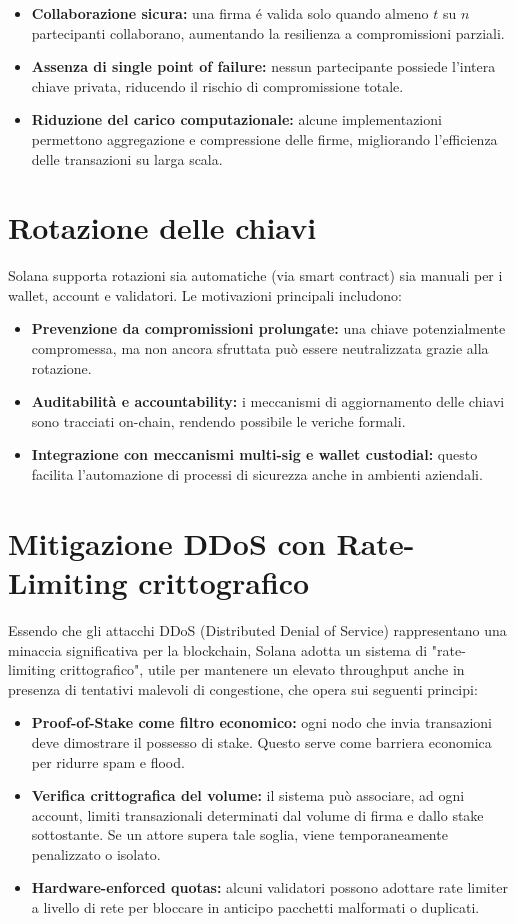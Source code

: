 \documentclass[a4paper,12pt]{report}
\begin{document}
	\begin{itemize}
		\item \textbf{Collaborazione sicura:} una firma é valida solo quando almeno \( t \) su \( n \) partecipanti collaborano, aumentando la resilienza a compromissioni parziali.
		\item \textbf{Assenza di single point of failure:} nessun partecipante possiede l’intera chiave privata, riducendo il rischio di compromissione totale.
		\item \textbf{Riduzione del carico computazionale:} alcune implementazioni permettono aggregazione e compressione delle firme, migliorando l’efficienza delle transazioni su larga scala.
	\end{itemize}
	
	\section{Rotazione delle chiavi}
	Solana supporta rotazioni sia automatiche (via smart contract) sia manuali per i wallet, account e validatori. Le motivazioni principali includono:
	\begin{itemize}
		\item \textbf{Prevenzione da compromissioni prolungate:} una chiave potenzialmente compromessa, ma non ancora sfruttata può essere neutralizzata grazie alla rotazione.
		\item \textbf{Auditabilità e accountability:} i meccanismi di aggiornamento delle chiavi sono tracciati on-chain, rendendo possibile le veriche formali.
		\item \textbf{Integrazione con meccanismi multi-sig e wallet custodial:} questo facilita l'automazione di processi di sicurezza anche in ambienti aziendali.
	\end{itemize}
	
	\section{Mitigazione DDoS con Rate-Limiting crittografico}
	Essendo che gli attacchi DDoS (Distributed Denial of Service) rappresentano una minaccia significativa per la blockchain, Solana adotta un sistema di "rate-limiting crittografico", utile per mantenere un elevato throughput anche in presenza di tentativi malevoli di congestione, che opera sui seguenti principi:
	
	\begin{itemize}
		\item \textbf{Proof-of-Stake come filtro economico:} ogni nodo che invia transazioni deve dimostrare il possesso di stake. Questo serve come barriera economica per ridurre spam e flood.
		\item \textbf{Verifica crittografica del volume:} il sistema può associare, ad ogni account, limiti transazionali determinati dal volume di firma e dallo stake sottostante. Se un attore supera tale soglia, viene temporaneamente penalizzato o isolato.
		\item \textbf{Hardware-enforced quotas:} alcuni validatori possono adottare rate limiter a livello di rete per bloccare in anticipo pacchetti malformati o duplicati.
	\end{itemize}
	
\end{document}
